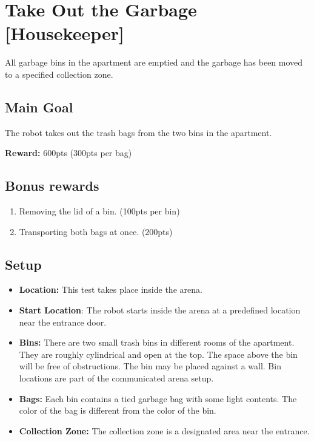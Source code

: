 \section{Take Out the Garbage [Housekeeper]}
\label{test:take-out-the-garbage}
All garbage bins in the apartment are emptied and the garbage has been moved to a specified collection zone.


\subsection*{Main Goal}
The robot takes out the trash bags from the two bins in the apartment.

\noindent\textbf{Reward:} 600pts (300pts per bag)

\subsection*{Bonus rewards}
\begin{enumerate}[nosep]
	\item Removing the lid of a bin. (100pts per bin)
	\item Transporting both bags at once. (200pts)
\end{enumerate}

\subsection*{Setup}
\begin{itemize}[nosep]
	\item \textbf{Location:} This test takes place inside the arena.
	\item \textbf{Start Location}: The robot starts inside the arena at a predefined location near the entrance door.
	\item \textbf{Bins:} There are two small trash bins in different rooms of the apartment. They are roughly cylindrical and open at the top. The space above the bin will be free of obstructions. The bin may be placed against a wall. Bin locations are part of the communicated arena setup.
	\item \textbf{Bags:} Each bin contains a tied garbage bag with some light contents. The color of the bag is different from the color of the bin.
	\item \textbf{Collection Zone:} The collection zone is a designated area near the entrance.
\end{itemize}


